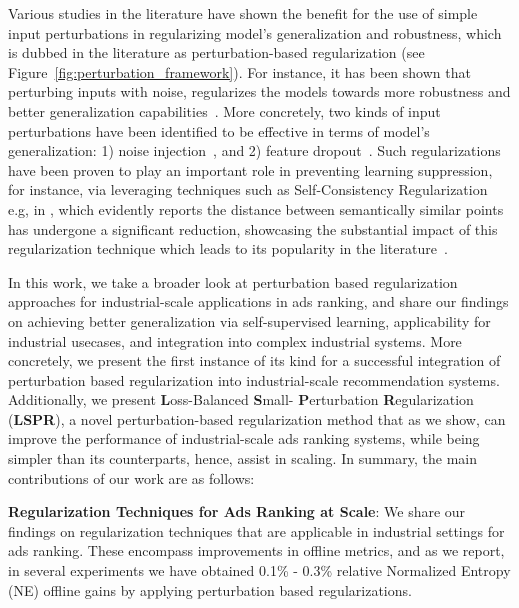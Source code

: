 Various studies in the literature have shown the benefit for the use of simple input perturbations in regularizing model's generalization and robustness, which is dubbed in the literature as perturbation-based regularization (see Figure~\ref{fig:perturbation_framework}).
For instance, it has been shown that perturbing inputs with noise, regularizes the models towards more robustness and better generalization capabilities~\cite{pmlr-v139-dhifallah21a,pmlr-v206-orvieto23a, hua2021noise, NIPS2013_38db3aed}.
More concretely, two kinds of input perturbations have been identified to be effective in terms of model's generalization: 1) noise injection~\cite{pmlr-v139-dhifallah21a,pmlr-v206-orvieto23a, hua2021noise}, and 2) feature dropout~\cite{tamkin2022feature,NIPS2013_38db3aed,JMLR:v15:srivastava14a}.
Such regularizations have been proven to play an important role in preventing learning suppression, for instance, via leveraging techniques such as Self-Consistency Regularization e.g, in \cite{sinha2021consistency}, which evidently reports the distance between semantically similar points has undergone a significant reduction, showcasing the substantial impact of this regularization technique which leads to its popularity in the literature~\cite{ko2022self,tan2022hyperspherical,sinha2021consistency,wang2021deep,englesson2021consistency,kim2021selfmatch,kim2022conmatch}.


In this work, we take a broader look at perturbation based regularization approaches for industrial-scale applications in ads ranking, and share our findings on achieving better generalization via self-supervised learning, applicability for industrial usecases, and integration into complex industrial systems. 
More concretely, we present the first instance of its kind for a successful integration of perturbation based regularization into industrial-scale recommendation systems.
Additionally, we present \textbf{L}oss-Balanced  \textbf{S}mall- \textbf{P}erturbation  \textbf{R}egularization (\textbf{LSPR}), a novel perturbation-based regularization method that as we show, can improve the performance of industrial-scale ads ranking systems, while being simpler than its counterparts, hence, assist in scaling.
In summary, the main contributions of our work are as follows:

\noindent \textbf{Regularization Techniques for Ads Ranking at Scale}: 
We share our findings on regularization techniques that are applicable in industrial settings for ads ranking. 
These encompass improvements in offline metrics, and as we report, in several experiments we have obtained 0.1\% - 0.3\% relative Normalized Entropy (NE) offline gains by applying perturbation based regularizations.

